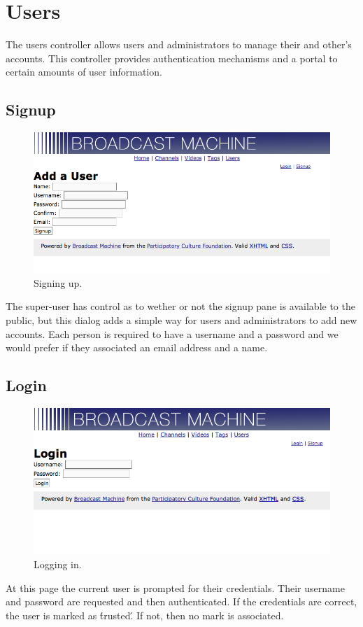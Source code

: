 \documentclass[a4paper,12pt]{report}
\begin{document}
\section{Users}
The users controller allows users and administrators to manage their and other's accounts.
This controller provides authentication mechanisms and a portal to certain amounts of user information.

\subsection{Signup}
\begin{figure}[h]
\begin{center}
\includegraphics[width=150mm]{./images/usersignup.png}
\end{center}
\caption{Signing up.}
\end{figure}
The super-user has control as to wether or not the signup pane is available to the public, but this dialog adds a simple way for users and administrators to add new accounts.
Each person is required to have a username and a password and we would prefer if they associated an email address and a name.

\subsection{Login}
\begin{figure}[h]
\begin{center}
\includegraphics[width=150mm]{./images/userlogin.png}
\end{center}
\caption{Logging in.}
\end{figure}
At this page the current user is prompted for their credentials.
Their username and password are requested and then authenticated.
If the credentials are correct, the user is marked as \'trusted\'.
If not, then no mark is associated.
\end{document}
